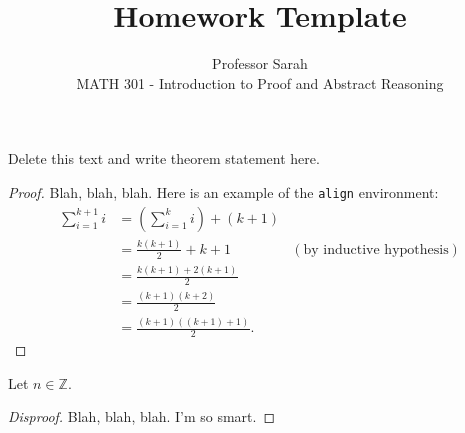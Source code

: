\documentclass[12pt]{article}
\newcommand{\Z}{\mathbb{Z}}
\newenvironment{theorem}[2][Theorem]{\begin{trivlist}
    \item[\hskip \labelsep {\bfseries #1}\hskip \labelsep {\bfseries #2.}]}{\end{trivlist}}
\newenvironment{proposition}[2][Proposition]{\begin{trivlist}
    \item[\hskip \labelsep {\bfseries #1}\hskip \labelsep {\bfseries #2.}]}{\end{trivlist}}
\begin{document}
      
       
        
	\title{Homework Template}%
	\author{Professor Sarah\\ %
	MATH 301 - Introduction to Proof and Abstract Reasoning} %
	 
	 \maketitle
	  
	  \begin{theorem}{x.yz} %
	  Delete this text and write theorem statement here.
	  \end{theorem}
	   
	   \begin{proof}
	   Blah, blah, blah.  Here is an example of the \texttt{align} environment:
	   \begin{align*}
	   \sum_{i=1}^{k+1}i & = \left(\sum_{i=1}^{k}i\right) +(k+1)\\ 
	   & = \frac{k(k+1)}{2}+k+1 & (\text{by inductive hypothesis})\\
	   & = \frac{k(k+1)+2(k+1)}{2}\\
	   & = \frac{(k+1)(k+2)}{2}\\
	   & = \frac{(k+1)((k+1)+1)}{2}.
	   \end{align*}
	   \end{proof}
	    
	    \begin{proposition}{x.yz}
	    Let $n\in \Z$.  
	    \end{proposition}
	     
	     \begin{proof}[Disproof]%
	     Blah, blah, blah.  I'm so smart.
	     \end{proof}
	      
	       
	       
\end{document}
